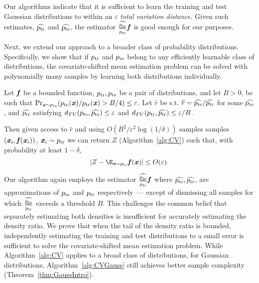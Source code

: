 Our algorithms indicate that it is sufficient to learn the training and test Gaussian distributions to within an $\varepsilon$ {\it total variation distance}. Given such estimates, $\widehat{p_{\mathrm{tr}}}$ and $\widehat{p_{\mathrm{te}}}$, the estimator $\frac{\widehat{p_{\mathrm{te}}}}{\widehat{p_{\mathrm{te}}}}\boldsymbol{\mathit{f}}$ is good enough for our purposes. 

Next, we extend our approach to a broader class of probability distributions. Specifically, we show that if $p_{\mathrm{tr}}$ and $p_{\mathrm{te}}$ belong to any efficiently learnable class of distributions, the covariate-shifted mean estimation problem can be solved with polynomially many samples by learning both distributions individually.

\begin{theorem}\label{thm:TV-Intro}
Let $\boldsymbol{\mathit{f}}$ be a bounded function, $p_{\mathrm{tr}}, p_{\mathrm{te}}$ be a pair of distributions, and let $B>0$, be such that $\Pr_{\boldsymbol{\mathit{x}}\sim p_{\mathrm{te}}}(p_{\mathrm{te}}(\boldsymbol{\mathit{x}})/ p_{\mathrm{tr}}(\boldsymbol{\mathit{x}}) > B/4) \leq \varepsilon$. Let $\widehat{r}$ be s.t. $\widehat{r} = \widehat{p_{\mathrm{te}}}/\widehat{p_{\mathrm{tr}}}$ for some $\widehat{p_{\mathrm{te}}}$, and $\widehat{p_{\mathrm{tr}}}$ satisfying $d_{TV}(p_{\mathrm{te}}, \widehat{p_{\mathrm{te}}}) \leq \varepsilon$ and $d_{TV}(p_{\mathrm{tr}}, \widehat{p_{\mathrm{tr}}}) \leq \varepsilon / B$.

Then given access to $\hat{r}$ and using $O(B^2/\varepsilon^2\log(1/\delta))$ samples samples $(\boldsymbol{\mathit{x}}_i, \boldsymbol{\mathit{f}}(\boldsymbol{\mathit{x}}_i))$, $\boldsymbol{\mathit{x}}_i\sim p_{\mathrm{tr}}$ we can return $Z$ (Algorithm~\ref{alg:CV}) such that, with probability at least $1-\delta$,
    \begin{equation*}
        |Z -\E_{\xx\sim \pte} \ff(\xx)| \leq O(\varepsilon).
    \end{equation*}
\end{theorem}

Our algorithm again employs the estimator $\frac{\widehat{p_{\mathrm{te}}}}{\widehat{p_{\mathrm{tr}}}}\boldsymbol{\mathit{f}}$ where $\widehat{p_{\mathrm{te}}},\widehat{p_{\mathrm{tr}}}$, are approximations of $p_{\mathrm{te}}$ and $p_{\mathrm{tr}}$ respectively~--- except of dismissing all samples for which $\frac{\widehat{p_{\mathrm{te}}}}{\widehat{p_{\mathrm{tr}}}}$ exceeds a threshold $B$. This challenges the common belief that separately estimating both densities is insufficient for accurately estimating the density ratio. We prove that when the tail of the density ratio is bounded, independently estimating the training and test distributions to a small error is sufficient to solve the covariate-shifted mean estimation problem. While Algorithm~\ref{alg:CV} applies to a broad class of distributions, for Gaussian distributions, Algorithm~\ref{alg:CVGauss} still achieves better sample complexity (Theorem~\ref{thm:GaussIntro}).


